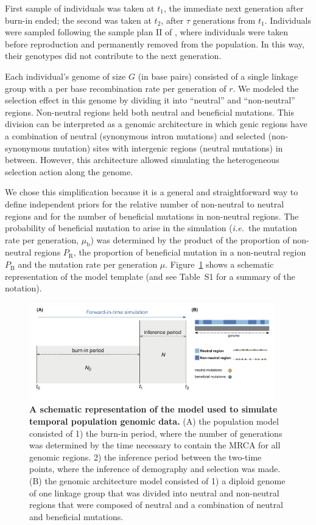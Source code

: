 \documentclass[a4paper, 12pt]{article}
\begin{document}
First sample of individuals was taken at $t_1$, the immediate next generation after burn-in ended; the second was taken at $t_2$, after $\tau$ generations from $t_1$. Individuals were sampled following the sample plan II of \citet{Nei:1981vb}, where individuals were taken before reproduction and permanently removed from the population. In this way, their genotypes did not contribute to the next generation.

Each individual's genome of size $G$ (in base pairs) consisted of a single linkage group with a per base recombination rate per generation of $r$. We modeled the selection effect in this genome by dividing it into ``neutral'' and ``non-neutral'' regions. Non-neutral regions held both neutral and beneficial mutations. This division can be interpreted as a genomic architecture in which genic regions have a combination of neutral (synonymous intron mutations) and selected (non-synonymous mutation) sites with intergenic regions (neutral mutations) in between. However, this architecture allowed simulating the heterogeneous selection action along the genome. 

We chose this simplification because it is a general and straightforward way to define independent priors for the relative number of non-neutral to neutral regions and for the number of beneficial mutations in non-neutral regions. The probability of beneficial mutation to arise in the simulation (\textit{i.e.}~the mutation rate per generation, $\mu_\mathrm{b}$) was determined by the product of the proportion of non-neutral regions $P_\mathrm{R}$, the proportion of beneficial mutation in a non-neutral region $P_\mathrm{B}$ and the mutation rate per generation $\mu$. Figure~\ref{fig:model} shows a schematic representation of the model template (and see Table~S1 for a summary of the notation).

\begin{figure}[ht]
  \centering
  \includegraphics[width=0.95\textwidth]{Figures/Figure1_model.pdf}
  \small\caption{\textbf{A schematic representation of the model used to simulate temporal population genomic data.} (A) the population model consisted of 1) the burn-in period, where the number of generations was determined by the time necessary to contain the MRCA for all genomic regions. 2) the inference period between the two-time points, where the inference of demography and selection was made. (B) the genomic architecture model consisted of 1) a diploid genome of one linkage group that was divided into neutral and non-neutral regions that were composed of neutral and a combination of neutral and beneficial mutations.}\label{fig:model}
\end{figure}
\end{document}
